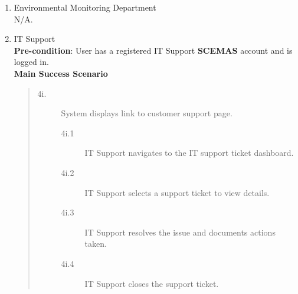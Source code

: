 \documentclass[]{article}
\begin{document}
\begin{enumerate}[{\bf BE8.}]
\begin{enumerate}[{\bf VP1.}]
			\item Environmental Monitoring Department \\
				    N/A.

			\item IT Support \\
                \textbf{Pre-condition}: User has a registered IT Support \textbf{SCEMAS} account and is logged in. \\
                \textbf{Main Success Scenario}
                \begin{quote}
    \begin{description}
        \item[\textmd{4i.}] System displays link to customer support page.
        \begin{description}
            \item[\textmd{4i.1}] IT Support navigates to the IT support ticket dashboard.
            \item[\textmd{4i.2}] IT Support selects a support ticket to view details.
            \item[\textmd{4i.3}] IT Support resolves the issue and documents actions taken.
            \item[\textmd{4i.4}] IT Support closes the support ticket.
        \end{description}
    \end{description}
\end{quote}



\end{enumerate}
\end{enumerate}
\end{document}
